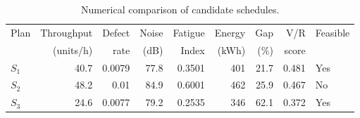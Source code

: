 \begin{table}[htbp]
\centering
\caption{Numerical comparison of candidate schedules.}
\label{tab:numerical-sim}
\small
\begin{tabular}{@{}lrrrrrrrl@{}}
\toprule
Plan & Throughput & Defect & Noise & Fatigue & Energy & Gap & V/R & Feasible \\
     & (units/h)  & rate   & (dB)  & Index   & (kWh)  & (\%) & score &         \\
\midrule
$S_{1}$ & 40.7 & 0.0079 & 77.8 & 0.3501 & 401 & 21.7 & 0.481 & Yes \\
$S_{2}$ & 48.2 & 0.01 & 84.9 & 0.6001 & 462 & 25.9 & 0.467 & No \\
$S_{3}$ & 24.6 & 0.0077 & 79.2 & 0.2535 & 346 & 62.1 & 0.372 & Yes \\
\bottomrule
\end{tabular}
\end{table}
